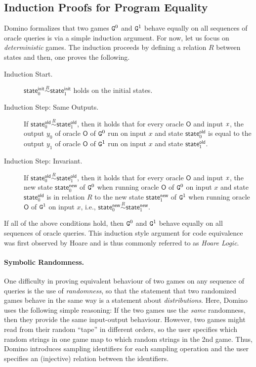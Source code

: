 \subsection{Induction Proofs for Program Equality}\label{sec:induction}\label{sec:obligations}
Domino formalizes that two games $\text{\texttt{G}}^0$ and $\text{\texttt{G}}^1$ behave equally on all sequences of oracle queries is via a simple induction argument. For now, let us focus on \emph{deterministic} games. The induction proceeds by defining a relation $R$ between states and then, one proves the following.
\begin{description}
\item[Induction Start.] $\mathsf{state}^{\mathsf{init}}_0\stackrel{R}{\sim} \mathsf{state}^{\mathsf{init}}_1$ holds on the initial states.
\item[Induction Step: Same Outputs.] If $\mathsf{state}^{\mathsf{old}}_0\stackrel{R}{\sim} \mathsf{state}^{\mathsf{old}}_1$, then it holds that for 
 every oracle $\mathsf{O}$ and input $\mathit{x}$, the output $y_0$ of oracle $\mathsf{O}$ of $\text{\texttt{G}}^0$ run on input $x$ and state $\mathsf{state}^{\mathsf{old}}_0$
is equal to the output $y_1$ of oracle $\mathsf{O}$ of $\text{\texttt{G}}^1$ run on input $x$ and state $\mathsf{state}^{\mathsf{old}}_1$.
\item[Induction Step: Invariant.] If $\mathsf{state}^{\mathsf{old}}_0\stackrel{R}{\sim} \mathsf{state}^{\mathsf{old}}_1$, then it holds that for 
 every oracle $\mathsf{O}$ and input $\mathit{x}$, the new state $\mathsf{state}^{\mathsf{new}}_0$ of $\text{\texttt{G}}^0$ when running oracle $\mathsf{O}$ of $\text{\texttt{G}}^0$ on input $x$ and state $\mathsf{state}^{\mathsf{old}}_0$ is in relation $R$ to the new state $\mathsf{state}^{\mathsf{new}}_1$ of $\text{\texttt{G}}^1$ when running oracle $\mathsf{O}$ of $\text{\texttt{G}}^1$ on input $x$, i.e., $\mathsf{state}^{\mathsf{new}}_0\stackrel{R}{\sim} \mathsf{state}^{\mathsf{new}}_1$.
\end{description}
If all of the above conditions hold, then $\text{\texttt{G}}^0$ and $\text{\texttt{G}}^1$ behave equally on all sequences of oracle queries. This induction style argument for code equivalence was first observed by Hoare and is thus commonly referred to as \emph{Hoare Logic}.

\paragraph{Symbolic Randomness.} One difficulty in proving equivalent behaviour of two games on any sequence of queries is the use of \emph{randomness}, so that the statement that two randomized games behave in the same way is a statement about \emph{distributions}. Here, Domino uses the following simple reasoning: If the two games use the \emph{same} randomness, then they provide the same input-output behaviour. However, two games might read from their random ``tape'' in different orders, so the user specifies which random strings in one game map to which random strings in the 2nd game. Thus, Domino introduces sampling identifiers for each sampling operation and the user specifies an (injective) relation between the identifiers.

